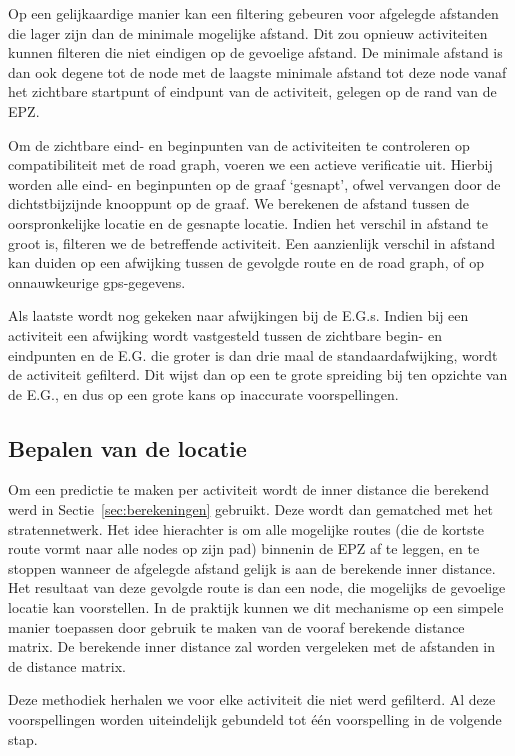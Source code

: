 Op een gelijkaardige manier kan een filtering gebeuren voor afgelegde afstanden
die lager zijn dan de minimale mogelijke afstand. Dit zou opnieuw activiteiten
kunnen filteren die niet eindigen op de gevoelige afstand. De minimale afstand
is dan ook degene tot de node met de laagste minimale afstand tot deze node
vanaf het zichtbare startpunt of eindpunt van de activiteit, gelegen op de rand
van de \ac{EPZ}.

Om de zichtbare eind- en beginpunten van de activiteiten te controleren op
compatibiliteit met de road graph, voeren we een actieve verificatie uit.
Hierbij worden alle eind- en beginpunten op de graaf `gesnapt', ofwel vervangen
door de dichtstbijzijnde knooppunt op de graaf. We berekenen de afstand tussen
de oorspronkelijke locatie en de gesnapte locatie. Indien het verschil in
afstand te groot is, filteren we de betreffende activiteit. Een aanzienlijk
verschil in afstand kan duiden op een afwijking tussen de gevolgde route en de
road graph, of op onnauwkeurige gps-gegevens.

Als laatste wordt nog gekeken naar afwijkingen bij de \acp{E.G.}. Indien bij
een activiteit een afwijking wordt vastgesteld tussen de zichtbare begin- en
eindpunten en de \ac{E.G.} die groter is dan drie maal de standaardafwijking,
wordt de activiteit gefilterd. Dit wijst dan op een te grote spreiding bij ten
opzichte van de \ac{E.G.}, en dus op een grote kans op inaccurate
voorspellingen.

\subsection{Bepalen van de locatie}
Om een predictie te maken per activiteit wordt de inner distance die berekend
werd in Sectie~\ref{sec:berekeningen} gebruikt. Deze wordt dan gematched met
het stratennetwerk. Het idee hierachter is om alle mogelijke routes (die de
kortste route vormt naar alle nodes op zijn pad) binnenin de \ac{EPZ} af te
leggen, en te stoppen wanneer de afgelegde afstand gelijk is aan de berekende
inner distance. Het resultaat van deze gevolgde route is dan een node, die
mogelijks de gevoelige locatie kan voorstellen. In de praktijk kunnen we dit
mechanisme op een simpele manier toepassen door gebruik te maken van de vooraf
berekende distance matrix. De berekende inner distance zal worden vergeleken
met de afstanden in de distance matrix.

Deze methodiek herhalen we voor elke activiteit die niet werd gefilterd. Al
deze voorspellingen worden uiteindelijk gebundeld tot één voorspelling in de
volgende stap.

